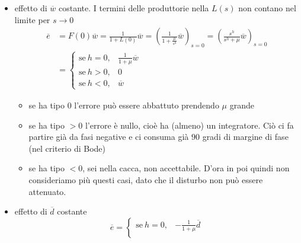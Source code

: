 \documentclass[10pt,a4paper]{book}
\begin{document}
\begin{itemize}
	\item effetto di $\overline{w}$ costante. I termini delle produttorie nella $L(s)$ non contano nel limite per $s\rightarrow 0$\begin{equation*}
	      \begin{aligned}
	      	\overline{e}      & =F(0)\overline{w} =\frac{1}{1+L(0)}\overline{w} =\left(\frac{1}{1+\frac{\mu }{s^h}}\overline{w}\right)_{s=0} =\left(\frac{s^h}{s^h +\mu }\overline{w}\right)_{s=0} \\
	      	                  & =\begin{cases}                                                                                                                                                     
	      	\text{se} \ h=0,  & \frac{1}{1+\mu }\overline{w}                                                                                                                                       \\
	      	\text{se} \ h >0, & 0                                                                                                                                                                  \\
	      	\text{se} \ h< 0, & \overline{w}                                                                                                                                                       
	      	\end{cases}
	      \end{aligned}
	\end{equation*}
	\begin{itemize}
		\item se ha tipo $0$ l'errore può essere abbattuto prendendo $\mu $ grande
		\item se ha tipo $ >0$ l'errore è nullo, cioè ha (almeno) un integratore. Ciò ci fa partire già da fasi negative e ci consuma già $90$ gradi di margine di fase (nel criterio di Bode)
		\item se ha tipo $< 0$, sei nella cacca, non accettabile. D'ora in poi quindi non consideriamo più questi casi, dato che il disturbo non può essere attenuato.
	\end{itemize}
	\item effetto di $\overline{d}$ costante\begin{equation*}
	      \overline{e} =\begin{cases}
	      \text{se} \ h=0, & -\frac{1}{1+\mu }\overline{d}\\

\end{cases}
\end{equation*}
\end{itemize}
\end{document}
